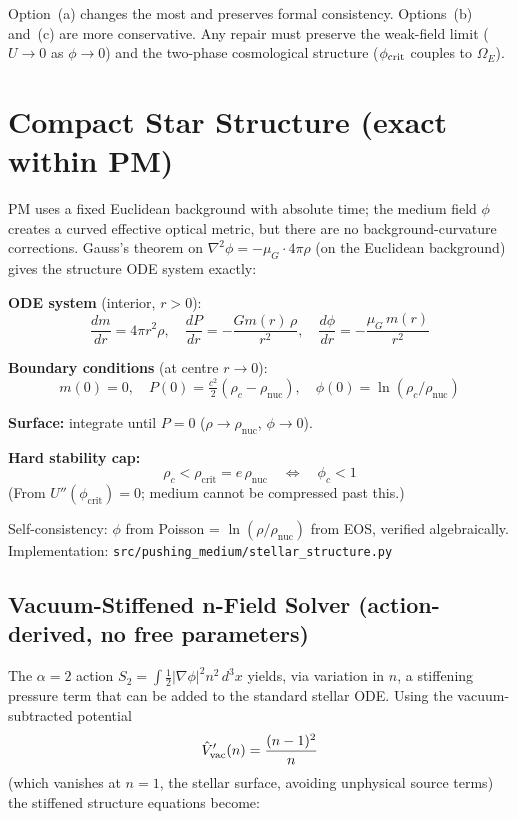 \documentclass[10pt,twocolumn]{article}
\begin{document}
Option~(a) changes the most and preserves formal consistency.
Options~(b) and~(c) are more conservative.  Any repair must preserve
the weak-field limit ($U\to 0$ as $\phi\to 0$) and the two-phase
cosmological structure ($\phi_{\rm crit}$ couples to $\Omega_E$).

\section{Compact Star Structure (exact within PM)}

PM uses a fixed Euclidean background with absolute time; the medium field $\phi$
creates a curved effective optical metric, but there are no background-curvature
corrections.
Gauss's theorem on $\nabla^2\phi = -\mu_G\cdot 4\pi\rho$ (on the Euclidean background) gives the
structure ODE system exactly:

\textbf{ODE system} (interior, $r>0$):
\[
  \frac{dm}{dr} = 4\pi r^2\rho, \quad
  \frac{dP}{dr} = -\frac{Gm(r)\,\rho}{r^2}, \quad
  \frac{d\phi}{dr} = -\frac{\mu_G\,m(r)}{r^2}
\]

\textbf{Boundary conditions} (at centre $r\to 0$):
\[
  m(0)=0,\quad P(0) = \tfrac{c^2}{2}(\rho_c-\rho_{\mathrm{nuc}}),\quad
  \phi(0) = \ln\!\left(\rho_c/\rho_{\mathrm{nuc}}\right)
\]

\textbf{Surface:} integrate until $P=0$ ($\rho\to\rho_{\mathrm{nuc}}$, $\phi\to 0$).

\textbf{Hard stability cap:}
\[
  \rho_c < \rho_{\mathrm{crit}} = e\,\rho_{\mathrm{nuc}}
  \quad\Leftrightarrow\quad \phi_c < 1
\]
(From $U''(\phi_{\mathrm{crit}})=0$; medium cannot be compressed past this.)

Self-consistency: $\phi$ from Poisson = $\ln(\rho/\rho_{\mathrm{nuc}})$ from
EOS, verified algebraically. Implementation: \texttt{src/pushing\_medium/stellar\_structure.py}

\subsection*{Vacuum-Stiffened n-Field Solver (action-derived, no free parameters)}

The $\alpha=2$ action $S_2=\int\tfrac{1}{2}|\nabla\phi|^2 n^2\,d^3x$ yields,
via variation in $n$, a stiffening pressure term that can be added to the standard
stellar ODE.  Using the vacuum-subtracted potential
\[
  \hat V'_{\rm vac}(n) = \frac{(n-1)^2}{n}
\]
(which vanishes at $n=1$, the stellar surface, avoiding unphysical source terms)
the stiffened structure equations become:
\end{document}
